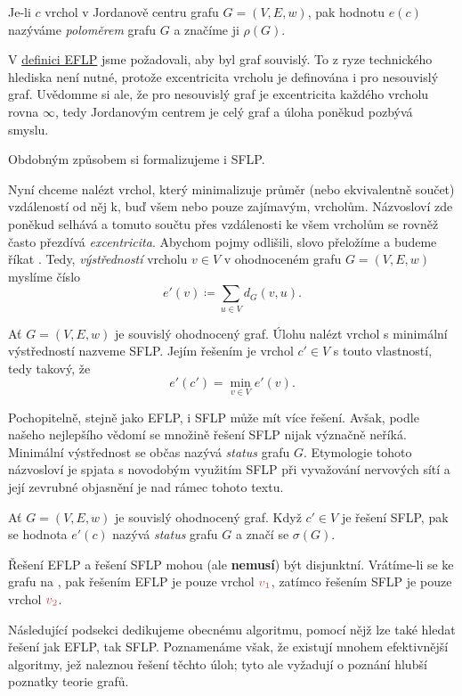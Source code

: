 \begin{definition}
\label{def:polomer-grafu}
 Je-li $c$ vrchol v Jordanově centru grafu $G = (V,E,w)$, pak hodnotu $e(c)$
 nazýváme \emph{poloměrem} grafu $G$ a značíme ji $\rho(G)$.
\end{definition}

\begin{remark}
 V \hyperref[def:eflp]{definici EFLP} jsme požadovali, aby byl graf souvislý.
 To z ryze technického hlediska není nutné, protože excentricita vrcholu je
 definována i pro nesouvislý graf. Uvědomme si ale, že pro nesouvislý graf je
 excentricita každého vrcholu rovna $\infty$, tedy Jordanovým centrem je celý
 graf a úloha poněkud pozbývá smyslu.
\end{remark}

Obdobným způsobem si formalizujeme i SFLP.

Nyní chceme nalézt vrchol, který minimalizuje průměr (nebo ekvivalent\-ně
součet) vzdáleností od něj k, buď všem nebo pouze zajímavým, vrcholům.
Názvosloví zde poněkud selhává a tomuto součtu přes vzdálenosti ke všem vrcholům
se rovněž často přezdívá \emph{excentricita}. Abychom pojmy odlišili, slovo
 přeložíme a budeme říkat . Tedy,
\emph{výstředností} vrcholu $v \in V$ v ohodnoceném grafu $G = (V,E,w)$ myslíme
číslo
\[
 e'(v) \coloneqq \sum_{u \in V} d_G(v,u).
\]

\begin{definition}
 \label{def:sflp}
 Ať $G = (V,E,w)$ je souvislý ohodnocený graf. Úlohu nalézt vrchol s minimální
 výstředností nazveme SFLP. Jejím řešením je vrchol $c' \in V$ s touto
 vlastností, tedy takový, že
 \[
  e'(c') = \min_{v \in V} e'(v).
 \]
\end{definition}

Pochopitelně, stejně jako EFLP, i SFLP může mít více řešení. Avšak, podle našeho
nejlepšího vědomí se množině řešení SFLP nijak význačně neříká. Minimální
výstřednost se občas nazývá \emph{status} grafu $G$. Etymologie tohoto
názvosloví je spjata s novodobým využitím SFLP při vyvažování nervových sítí a
její zevrubné objasnění je nad rámec tohoto textu.

\begin{definition}
 Ať $G = (V,E,w)$ je souvislý ohodnocený graf. Když $c' \in V$ je řešení SFLP,
 pak se hodnota $e'(c)$ nazývá \emph{status} grafu $G$ a značí se $\sigma(G)$.
\end{definition}

\begin{warning}
 Řešení EFLP a řešení SFLP mohou (ale \textbf{nemusí}) být disjunktní.
 Vrátíme-li se ke grafu na , pak řešením
 EFLP je pouze vrchol $\clr{v_1}$, zatímco řešením SFLP je pouze vrchol
 $\clr{v_2}$. 
\end{warning}

Následující podsekci dedikujeme obecnému algoritmu, pomocí nějž lze také hledat
řešení jak EFLP, tak SFLP. Poznamenáme však, že existují mnohem efektivnější
algoritmy, jež naleznou řešení těchto úloh; tyto ale vyžadují o poznání hlubší
poznatky teorie grafů.


